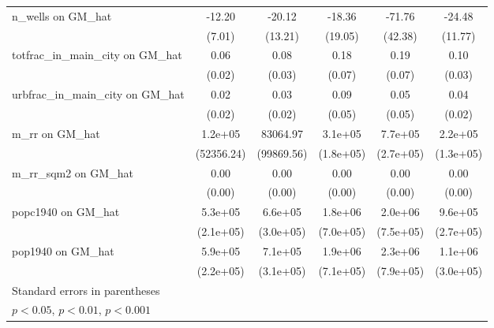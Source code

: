 \begin{table}[htbp]
\begin{tabular}{l*{5}{c}}
\addlinespace
n\_wells on GM\_hat&   -12.20         &   -20.12         &   -18.36         &   -71.76         &   -24.48\sym{*}  \\
                &   (7.01)         &  (13.21)         &  (19.05)         &  (42.38)         &  (11.77)         \\
\addlinespace
totfrac\_in\_main\_city on GM\_hat&     0.06\sym{**} &     0.08\sym{**} &     0.18\sym{**} &     0.19\sym{**} &     0.10\sym{***}\\
                &   (0.02)         &   (0.03)         &   (0.07)         &   (0.07)         &   (0.03)         \\
\addlinespace
urbfrac\_in\_main\_city on GM\_hat&     0.02         &     0.03         &     0.09         &     0.05         &     0.04\sym{*}  \\
                &   (0.02)         &   (0.02)         &   (0.05)         &   (0.05)         &   (0.02)         \\
\addlinespace
m\_rr on GM\_hat  &  1.2e+05\sym{*}  & 83064.97         &  3.1e+05         &  7.7e+05\sym{**} &  2.2e+05         \\
                &(52356.24)         &(99869.56)         &(1.8e+05)         &(2.7e+05)         &(1.3e+05)         \\
\addlinespace
m\_rr\_sqm2 on GM\_hat&     0.00         &     0.00         &     0.00         &     0.00         &     0.00\sym{*}  \\
                &   (0.00)         &   (0.00)         &   (0.00)         &   (0.00)         &   (0.00)         \\
\addlinespace
popc1940 on GM\_hat&  5.3e+05\sym{*}  &  6.6e+05\sym{*}  &  1.8e+06\sym{*}  &  2.0e+06\sym{**} &  9.6e+05\sym{***}\\
                &(2.1e+05)         &(3.0e+05)         &(7.0e+05)         &(7.5e+05)         &(2.7e+05)         \\
\addlinespace
pop1940 on GM\_hat&  5.9e+05\sym{**} &  7.1e+05\sym{*}  &  1.9e+06\sym{**} &  2.3e+06\sym{**} &  1.1e+06\sym{***}\\
                &(2.2e+05)         &(3.1e+05)         &(7.1e+05)         &(7.9e+05)         &(3.0e+05)         \\
\bottomrule
\multicolumn{6}{l}{\footnotesize Standard errors in parentheses}\\
\multicolumn{6}{l}{\footnotesize \sym{*} \(p<0.05\), \sym{**} \(p<0.01\), \sym{***} \(p<0.001\)}\\
\end{tabular}
\end{table}
